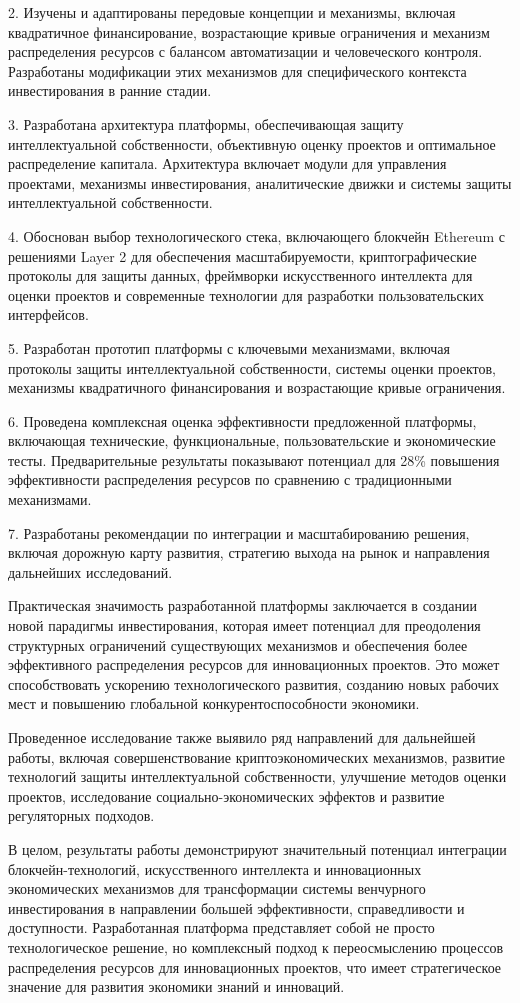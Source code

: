 \documentclass[
    candidate, %
    subf, %
    dotsinheaders=false,
]{disser}
\begin{document}
2. Изучены и адаптированы передовые концепции и механизмы, включая квадратичное финансирование, возрастающие кривые ограничения и механизм распределения ресурсов с балансом автоматизации и человеческого контроля. Разработаны модификации этих механизмов для специфического контекста инвестирования в ранние стадии.

3. Разработана архитектура платформы, обеспечивающая защиту интеллектуальной собственности, объективную оценку проектов и оптимальное распределение капитала. Архитектура включает модули для управления проектами, механизмы инвестирования, аналитические движки и системы защиты интеллектуальной собственности.

4. Обоснован выбор технологического стека, включающего блокчейн Ethereum с решениями Layer 2 для обеспечения масштабируемости, криптографические протоколы для защиты данных, фреймворки искусственного интеллекта для оценки проектов и современные технологии для разработки пользовательских интерфейсов.

5. Разработан прототип платформы с ключевыми механизмами, включая протоколы защиты интеллектуальной собственности, системы оценки проектов, механизмы квадратичного финансирования и возрастающие кривые ограничения.

6. Проведена комплексная оценка эффективности предложенной платформы, включающая технические, функциональные, пользовательские и экономические тесты. Предварительные результаты показывают потенциал для 28\% повышения эффективности распределения ресурсов по сравнению с традиционными механизмами.

7. Разработаны рекомендации по интеграции и масштабированию решения, включая дорожную карту развития, стратегию выхода на рынок и направления дальнейших исследований.

Практическая значимость разработанной платформы заключается в создании новой парадигмы инвестирования, которая имеет потенциал для преодоления структурных ограничений существующих механизмов и обеспечения более эффективного распределения ресурсов для инновационных проектов. Это может способствовать ускорению технологического развития, созданию новых рабочих мест и повышению глобальной конкурентоспособности экономики.

Проведенное исследование также выявило ряд направлений для дальнейшей работы, включая совершенствование криптоэкономических механизмов, развитие технологий защиты интеллектуальной собственности, улучшение методов оценки проектов, исследование социально-экономических эффектов и развитие регуляторных подходов.

В целом, результаты работы демонстрируют значительный потенциал интеграции блокчейн-технологий, искусственного интеллекта и инновационных экономических механизмов для трансформации системы венчурного инвестирования в направлении большей эффективности, справедливости и доступности. Разработанная платформа представляет собой не просто технологическое решение, но комплексный подход к переосмыслению процессов распределения ресурсов для инновационных проектов, что имеет стратегическое значение для развития экономики знаний и инноваций.





\end{document}
